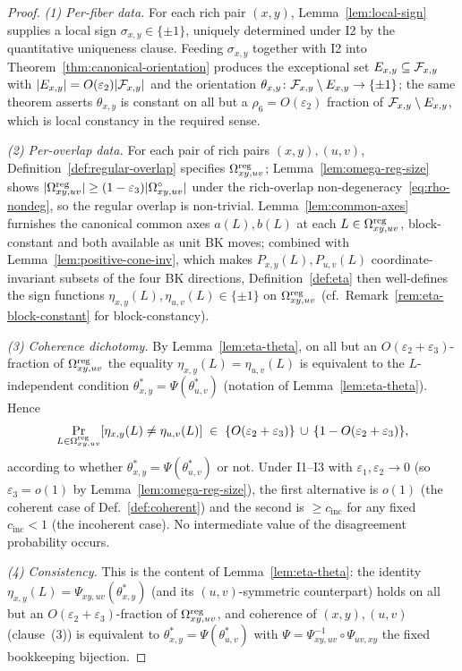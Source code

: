 \begin{proof}
\emph{(1) Per-fiber data.}
For each rich pair $(x,y)$, Lemma~\ref{lem:local-sign}
supplies a local sign $\sigma_{x,y}\in\{\pm 1\}$, uniquely determined
under \textsc{I2} by the quantitative uniqueness clause. Feeding
$\sigma_{x,y}$ together with \textsc{I2} into
Theorem~\ref{thm:canonical-orientation} produces the
exceptional set $E_{x,y}\subseteq\mathcal{F}_{x,y}$ with $|E_{x,y}|=O(\varepsilon_2)|\mathcal{F}_{x,y}|$
and the orientation $\theta_{x,y}\colon\mathcal{F}_{x,y}\setminus E_{x,y}\to\{\pm 1\}$;
the same theorem asserts $\theta_{x,y}$ is constant on all but a
$\rho_6=O(\varepsilon_2)$ fraction of $\mathcal{F}_{x,y}\setminus E_{x,y}$, which is
local constancy in the required sense.

\emph{(2) Per-overlap data.}
For each pair of rich pairs $(x,y),(u,v)$,
Definition~\ref{def:regular-overlap} specifies
$\Omega^{\mathrm{reg}}_{xy,uv}$; Lemma~\ref{lem:omega-reg-size} shows
$|\Omega^{\mathrm{reg}}_{xy,uv}|\ge(1-\varepsilon_3)|\Omega^\circ_{xy,uv}|$ under
the rich-overlap non-degeneracy~\eqref{eq:rho-nondeg}, so the regular
overlap is non-trivial. Lemma~\ref{lem:common-axes} furnishes
the canonical common axes $a(L),b(L)$ at each $L\in\Omega^{\mathrm{reg}}_{xy,uv}$,
block-constant and both available as unit BK moves; combined with
Lemma~\ref{lem:positive-cone-inv}, which makes
$P_{x,y}(L),P_{u,v}(L)$ coordinate-invariant subsets of the four BK
directions, Definition~\ref{def:eta} then well-defines the sign
functions $\eta_{x,y}(L),\eta_{u,v}(L)\in\{\pm 1\}$ on
$\Omega^{\mathrm{reg}}_{xy,uv}$ (cf.\ Remark~\ref{rem:eta-block-constant} for
block-constancy).

\emph{(3) Coherence dichotomy.}
By Lemma~\ref{lem:eta-theta}, on all but an
$O(\varepsilon_2+\varepsilon_3)$-fraction of $\Omega^{\mathrm{reg}}_{xy,uv}$ the
equality $\eta_{x,y}(L)=\eta_{u,v}(L)$ is equivalent to the
$L$-independent condition
$\theta^\ast_{x,y}=\Psi(\theta^\ast_{u,v})$ (notation of
Lemma~\ref{lem:eta-theta}). Hence
\[
  \Pr_{L\in\Omega^{\mathrm{reg}}_{xy,uv}}[\eta_{x,y}(L)\ne\eta_{u,v}(L)]
  \;\in\;
  \{O(\varepsilon_2+\varepsilon_3)\}\,\cup\,\{1-O(\varepsilon_2+\varepsilon_3)\},
\]
according to whether $\theta^\ast_{x,y}=\Psi(\theta^\ast_{u,v})$ or
not. Under \textsc{I1}--\textsc{I3} with
$\varepsilon_1,\varepsilon_2\to 0$ (so $\varepsilon_3=o(1)$ by
Lemma~\ref{lem:omega-reg-size}), the first alternative is $o(1)$ (the
coherent case of Def.~\ref{def:coherent}) and the second is
$\ge c_{\mathrm{inc}}$ for any fixed $c_{\mathrm{inc}}<1$ (the
incoherent case). No intermediate value of the disagreement
probability occurs.

\emph{(4) Consistency.}
This is the content of Lemma~\ref{lem:eta-theta}: the identity
$\eta_{x,y}(L)=\Psi_{xy,uv}(\theta^\ast_{x,y})$ (and its $(u,v)$-symmetric
counterpart) holds on all but an $O(\varepsilon_2+\varepsilon_3)$-fraction
of $\Omega^{\mathrm{reg}}_{xy,uv}$, and coherence of $(x,y),(u,v)$ (clause~(3)) is
equivalent to $\theta^\ast_{x,y}=\Psi(\theta^\ast_{u,v})$ with
$\Psi=\Psi_{xy,uv}^{-1}\circ\Psi_{uv,xy}$ the fixed bookkeeping
bijection.
\end{proof}

